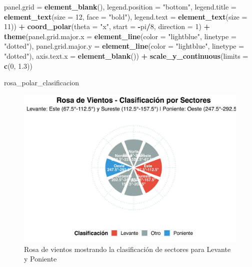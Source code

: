 \documentclass[
]{article}
\newenvironment{Shaded}{\begin{snugshade}}{\end{snugshade}}
\newcommand{\AttributeTok}[1]{\textcolor[rgb]{0.13,0.29,0.53}{#1}}
\newcommand{\DecValTok}[1]{\textcolor[rgb]{0.00,0.00,0.81}{#1}}
\newcommand{\FloatTok}[1]{\textcolor[rgb]{0.00,0.00,0.81}{#1}}
\newcommand{\FunctionTok}[1]{\textcolor[rgb]{0.13,0.29,0.53}{\textbf{#1}}}
\newcommand{\NormalTok}[1]{#1}
\newcommand{\SpecialCharTok}[1]{\textcolor[rgb]{0.81,0.36,0.00}{\textbf{#1}}}
\newcommand{\StringTok}[1]{\textcolor[rgb]{0.31,0.60,0.02}{#1}}
\begin{document}
\begin{Shaded}
\begin{Highlighting}[]
    \AttributeTok{panel.grid =} \FunctionTok{element\_blank}\NormalTok{(), }\AttributeTok{legend.position =} \StringTok{"bottom"}\NormalTok{,}
    \AttributeTok{legend.title =} \FunctionTok{element\_text}\NormalTok{(}\AttributeTok{size =} \DecValTok{12}\NormalTok{,}
        \AttributeTok{face =} \StringTok{"bold"}\NormalTok{), }\AttributeTok{legend.text =} \FunctionTok{element\_text}\NormalTok{(}\AttributeTok{size =} \DecValTok{11}\NormalTok{)) }\SpecialCharTok{+}
    \FunctionTok{coord\_polar}\NormalTok{(}\AttributeTok{theta =} \StringTok{"x"}\NormalTok{, }\AttributeTok{start =} \SpecialCharTok{{-}}\NormalTok{pi}\SpecialCharTok{/}\DecValTok{8}\NormalTok{,}
        \AttributeTok{direction =} \DecValTok{1}\NormalTok{) }\SpecialCharTok{+} \FunctionTok{theme}\NormalTok{(}\AttributeTok{panel.grid.major.x =} \FunctionTok{element\_line}\NormalTok{(}\AttributeTok{color =} \StringTok{"lightblue"}\NormalTok{,}
    \AttributeTok{linetype =} \StringTok{"dotted"}\NormalTok{), }\AttributeTok{panel.grid.major.y =} \FunctionTok{element\_line}\NormalTok{(}\AttributeTok{color =} \StringTok{"lightblue"}\NormalTok{,}
    \AttributeTok{linetype =} \StringTok{"dotted"}\NormalTok{), }\AttributeTok{axis.text.x =} \FunctionTok{element\_blank}\NormalTok{()) }\SpecialCharTok{+}
    \FunctionTok{scale\_y\_continuous}\NormalTok{(}\AttributeTok{limits =} \FunctionTok{c}\NormalTok{(}\DecValTok{0}\NormalTok{, }\FloatTok{1.3}\NormalTok{))}

\NormalTok{rosa\_polar\_clasificacion}
\end{Highlighting}
\end{Shaded}

\begin{figure}[h]

{\centering \includegraphics{Levante_Analisys_files/figure-latex/wind-rose-classification-1} 

}

\caption{Rosa de vientos mostrando la clasificación de sectores para Levante y Poniente}\label{fig:wind-rose-classification}
\end{figure}
\end{document}
